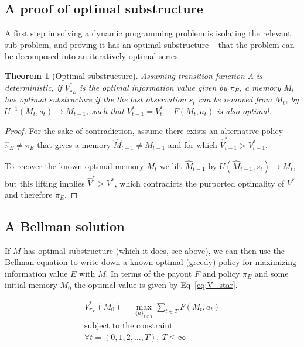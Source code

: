 \documentclass[9pt,twocolumn,twoside]{pnas-new}
\newtheorem{theorem}{Theorem}
\begin{document}
\subsection*{A proof of optimal substructure}
A first step in solving a dynamic programming problem is isolating the relevant sub-problem, and proving it has an optimal substructure -- that the problem can be decomposed into an iteratively optimal series. 

\begin{theorem}[Optimal substructure] \label{theorem:opt_sub}
    Assuming transition function $\Lambda$ is deterministic, if $V^*_{\pi_E}$ is the optimal information value given by $\pi_E$, a memory $M_t$ has optimal substructure if the the last observation $s_t$ can be removed from $M_t$, by $U^{-1}(M_t, s_t) \rightarrow M_{t-1}$, such that $V^*_{t-1} = V^*_t - F(M_t, a_t)$ is also optimal. 
\end{theorem}
\begin{proof}
    For the sake of contradiction, assume there exists an alternative policy $\hat \pi_E \neq \pi_E$ that gives a memory $\hat M_{t-1} \neq M_{t-1}$ and for which $\hat V^*_{t-1} > V^*_{t-1}$. 

    To recover the known optimal memory $M_t$ we lift $\hat M_{t-1}$ by $U(\hat M_{t-1}, s_t) \rightarrow M_t$, but this lifting implies $\hat V^* > V^*$, which contradicts the purported optimality of $V^*$ and therefore $\pi_E$.
\end{proof}


\subsection*{A Bellman solution}
If $M$ has optimal substructure (which it does, see above), we can then use the Bellman equation \cite{Bellman} to write down a known optimal (greedy) policy for maximizing information value $E$ with $M$. In terms of the payout $F$ and policy $\pi_E$ and some initial memory $M_0$ the optimal value is given by Eq~\ref{eq:V_star}.

\begin{equation} \label{eq:V_star}
    \begin{split}
        V^*_{\pi_E}(M_0) = \max_{\{a\}_{t \in T}} \sum_{t \in T} F(M_t, a_t)\\
        \text{subject to the constraint}\\
        \forall t = (0,1,2,\ldots, T),\ T \leq \infty
    \end{split}
\end{equation}
\end{document}
